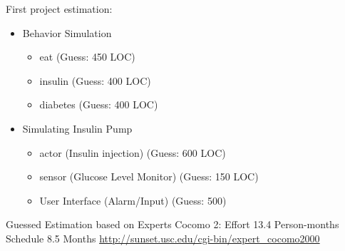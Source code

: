 First project estimation:
\begin{itemize}
  \item Behavior Simulation
  	\begin{itemize}
        \item eat (Guess: 450 LOC)
        \item insulin (Guess: 400 LOC)
        \item diabetes (Guess: 400 LOC)
    \end{itemize}
  \item Simulating Insulin Pump
  	\begin{itemize}
        \item actor (Insulin injection) (Guess: 600 LOC)
        \item sensor (Glucose Level Monitor) (Guess: 150 LOC)
        \item User Interface (Alarm/Input) (Guess: 500)
    \end{itemize}
\end{itemize} 
Guessed Estimation based on Experts Cocomo 2:
Effort 13.4 Person-months
Schedule 8.5 Months
\url{http://sunset.usc.edu/cgi-bin/expert_cocomo2000}
